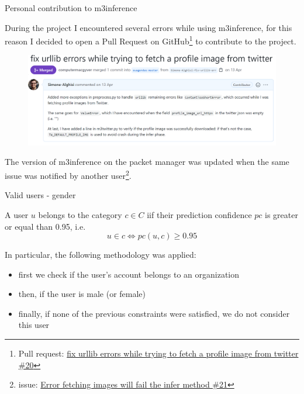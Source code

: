 \documentclass[9pt,aspectratio=1610]{beamer}  %
\begin{document}
\begin{frame}{Personal contribution to m3inference}

	During the project I encountered several errors while using m3inference, for this reason I decided to open a Pull Request on GitHub\footnote{Pull request: \href{https://github.com/euagendas/m3inference/pull/20}{fix urllib errors while trying to fetch a profile image from twitter \#20}} to contribute to the project.
	
	\begin{figure}
	    \centering
	    \includegraphics[scale=0.195]{assets/img/pull_request.png}
	\end{figure}
	
	The version of m3inference on the packet manager was updated when the same issue was notified by another user\footnote{issue: \href{https://github.com/euagendas/m3inference/issues/21}{Error fetching images will fail the infer method \#21}}.
	
\end{frame}

\begin{frame}{Valid users - gender}

    \begin{definition}[3]
    \label{def:valid-users}
    	A user \(u\) belongs to the category \(c \in C\) iif their prediction confidence \(pc\) is greater or equal than 0.95, i.e.
    	\[u \in c \Longleftrightarrow pc(u, c) \geq 0.95\]
    \end{definition}
    	
    In particular, the following methodology was applied:
    	
    \begin{itemize}
    	\item first we check if the user's account belongs to an organization
    	\item then, if the user is male (or female)
    	\item finally, if none of the previous constraints were satisfied, we do not consider this user
    \end{itemize}
    
\end{frame}
\end{document}
